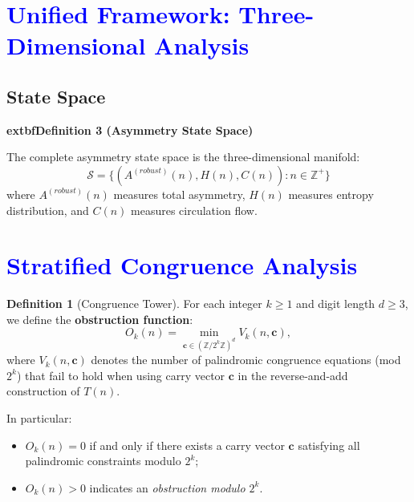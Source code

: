 \documentclass[11pt,a4paper]{article}
\theoremstyle{plain}
\theoremstyle{definition}
\newtheorem{definition}[theorem]{Definition}
\newenvironment{definitionbox}
    {\begin{center}\begin{minipage}{0.95\textwidth}\color{blue}\bfseries}
    {\end{minipage}\end{center}}
\begin{document}


\section{\textcolor{blue}{Unified Framework: Three-Dimensional Analysis}}

\subsection{State Space}

\begin{definitionbox}
	extbf{Definition 3 (Asymmetry State Space)}\label{def:state_space}

The complete asymmetry state space is the three-dimensional manifold:
\[
\mathcal{S} = \{(A^{(robust)}(n), H(n), C(n)) : n \in \mathbb{Z}^+\}
\]
where $A^{(robust)}(n)$ measures total asymmetry, $H(n)$ measures entropy distribution, and $C(n)$ measures circulation flow.
\end{definitionbox}


\section{\textcolor{blue}{Stratified Congruence Analysis}}

\begin{definition}[Congruence Tower]
For each integer $k \ge 1$ and digit length $d \ge 3$, 
we define the \textbf{obstruction function}:
\[
O_k(n)
  = \min_{\mathbf{c} \in (\mathbb{Z}/2^k\mathbb{Z})^d}
     V_k(n, \mathbf{c}),
\]
where $V_k(n, \mathbf{c})$ denotes the number of palindromic 
congruence equations (mod $2^k$) that fail to hold when using
carry vector $\mathbf{c}$ in the reverse-and-add construction of $T(n)$.

In particular:
\begin{itemize}
\item $O_k(n) = 0$ if and only if there exists a carry vector 
$\mathbf{c}$ satisfying all palindromic constraints modulo $2^k$;
\item $O_k(n) > 0$ indicates an \emph{obstruction modulo $2^k$}.
\end{itemize}
\end{definition}
\end{document}
